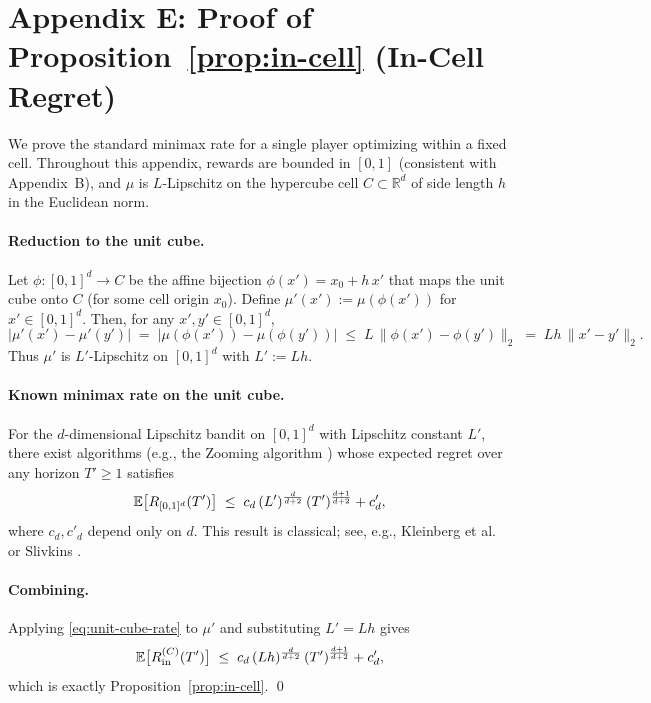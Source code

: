 \section*{Appendix E: Proof of Proposition~\ref{prop:in-cell} (In-Cell Regret)}
\label{app:in-cell}

We prove the standard minimax rate for a single player optimizing within a fixed cell.
Throughout this appendix, rewards are bounded in $[0,1]$ (consistent with Appendix~B), and $\mu$ is $L$-Lipschitz on the hypercube cell $C\subset\mathbb R^d$ of side length $h$ in the Euclidean norm.

\paragraph{Reduction to the unit cube.}
Let $\phi:[0,1]^d\to C$ be the affine bijection $\phi(x')=x_0+h\,x'$ that maps the unit cube onto $C$ (for some cell origin $x_0$).
Define $\mu'(x'):=\mu(\phi(x'))$ for $x'\in[0,1]^d$.
Then, for any $x',y'\in[0,1]^d$,
\[
|\mu'(x')-\mu'(y')|
\;=\;
|\mu(\phi(x'))-\mu(\phi(y'))|
\;\le\; L\, \|\phi(x')-\phi(y')\|_2
\;=\; L h\, \|x'-y'\|_2.
\]
Thus $\mu'$ is $L'$-Lipschitz on $[0,1]^d$ with $L':=Lh$.

\paragraph{Known minimax rate on the unit cube.}
For the $d$-dimensional Lipschitz bandit on $[0,1]^d$ with Lipschitz constant $L'$, there exist algorithms (e.g., the Zooming algorithm \citep{Kleinberg}) whose expected regret over any horizon $T'\ge 1$ satisfies
\begin{equation}
\label{eq:unit-cube-rate}
\mathbb{E}\big[R_{[0,1]^d}(T')\big]
\;\le\;
c_d\,(L')^{\frac{d}{d+2}}\, (T')^{\frac{d+1}{d+2}} + c'_d,
\end{equation}
where $c_d,c'_d$ depend only on $d$.
This result is classical; see, e.g., Kleinberg et al. \citep{Kleinberg} or Slivkins \citep{slivkins2019introduction}.

\paragraph{Combining.}
Applying \eqref{eq:unit-cube-rate} to $\mu'$ and substituting $L'=Lh$ gives
\[
\mathbb{E}\big[R_{\mathrm{in}}^{(C)}(T')\big]
\;\le\;
c_d\,(Lh)^{\frac{d}{d+2}}\,(T')^{\frac{d+1}{d+2}} + c'_d,
\]
which is exactly Proposition~\ref{prop:in-cell}.
\qed

\medskip

